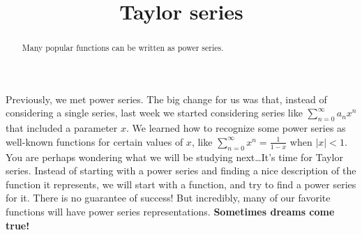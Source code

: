 \documentclass{ximera}
\title{Taylor series}
\begin{document}
\begin{abstract}
  Many popular functions can be written as power series.
\end{abstract}

\maketitle

Previously, we met power series.  The big change for us was that,
instead of considering a single series, last week we started
considering series like \(\sum_{n=0}^\infty a_n x^n\) that included a
parameter \(x\).  We learned how to recognize some power series as
well-known functions for certain values of \(x\), like
\(\sum_{n=0}^\infty x^n = \frac{1}{1-x}\) when \(|x| < 1\).  You are
perhaps wondering what we will be studying next\ldots It's time for
Taylor series.  Instead of starting with a power series and finding a
nice description of the function it represents, we will start with a
function, and try to find a power series for it.  There is no
guarantee of success!  But incredibly, many of our favorite functions
will have power series representations.  \textbf{Sometimes dreams come
  true!}
\end{document}
